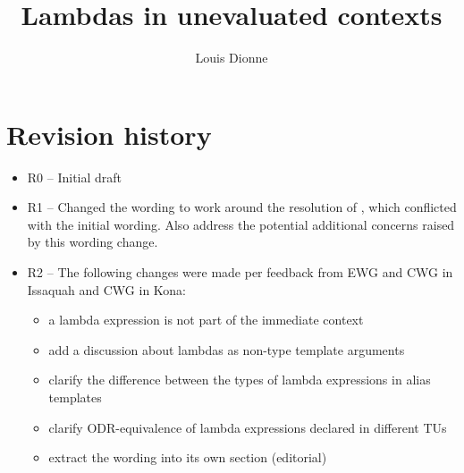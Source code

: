 \documentclass{wg21}
\title{Lambdas in unevaluated contexts}
\author{Louis Dionne}{ldionne.2@gmail.com}
\begin{document}
\maketitle

\section{Revision history}
\begin{itemize}
  \item R0 -- Initial draft
  \item R1 -- Changed the wording to work around the resolution of \cite{DR1607},
              which conflicted with the initial wording. Also address the
              potential additional concerns raised by this wording change.
  \item R2 -- The following changes were made per feedback from EWG and CWG
              in Issaquah and CWG in Kona:
              \begin{itemize}
                \item a lambda expression is not part of the immediate context
                \item add a discussion about lambdas as non-type template arguments
                \item clarify the difference between the types of lambda expressions
                      in alias templates
                \item clarify ODR-equivalence of lambda expressions declared in
                      different TUs
                \item extract the wording into its own section (editorial)
              \end{itemize}
\end{itemize}


\end{document}
